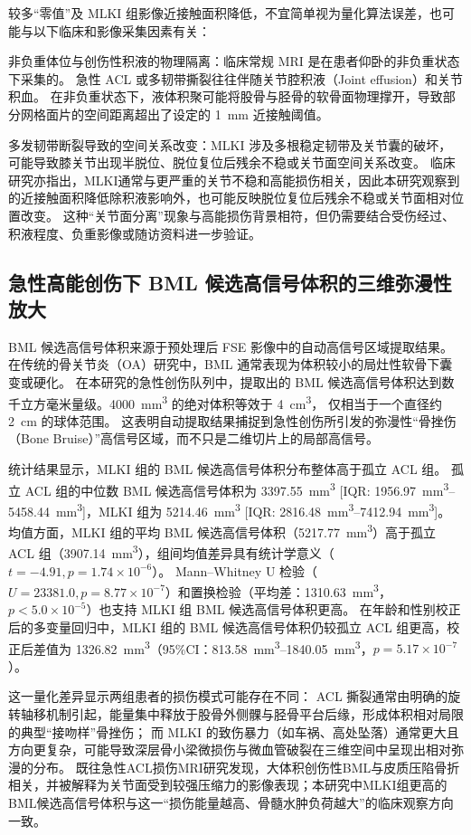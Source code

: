     \par 较多“零值”及 MLKI 组影像近接触面积降低，不宜简单视为量化算法误差，也可能与以下临床和影像采集因素有关：
    \par 非负重体位与创伤性积液的物理隔离：临床常规 MRI 是在患者仰卧的非负重状态下采集的。
    急性 ACL 或多韧带撕裂往往伴随关节腔积液（Joint effusion）和关节积血。
    在非负重状态下，液体积聚可能将股骨与胫骨的软骨面物理撑开，导致部分网格面片的空间距离超出了设定的 \qty{1}{\milli\metre} 近接触阈值。
    \par 多发韧带断裂导致的空间关系改变：MLKI 涉及多根稳定韧带及关节囊的破坏，可能导致膝关节出现半脱位、脱位复位后残余不稳或关节面空间关系改变。
    临床研究亦指出，MLKI通常与更严重的关节不稳和高能损伤相关\cite{moatsheDiagnosisTreatmentMultiligament2017}，因此本研究观察到的近接触面积降低除积液影响外，也可能反映脱位复位后残余不稳或关节面相对位置改变。
    这种“关节面分离”现象与高能损伤背景相符，但仍需要结合受伤经过、积液程度、负重影像或随访资料进一步验证。
  \subsection{急性高能创伤下 BML 候选高信号体积的三维弥漫性放大}
    BML 候选高信号体积来源于预处理后 FSE 影像中的自动高信号区域提取结果。
    在传统的骨关节炎（OA）研究中，BML 通常表现为体积较小的局灶性软骨下囊变或硬化\cite{frobellAcutelyACLInjured2008}。
    在本研究的急性创伤队列中，提取出的 BML 候选高信号体积达到数千立方毫米量级。\qty{4000}{\cubic\milli\metre} 的绝对体积等效于 \qty{4}{\cubic\centi\metre}， 
    仅相当于一个直径约 \qty{2}{\centi\metre} 的球体范围。
    这表明自动提取结果捕捉到急性创伤所引发的弥漫性“骨挫伤（Bone Bruise）”高信号区域，而不只是二维切片上的局部高信号。
    \par 统计结果显示，MLKI 组的 BML 候选高信号体积分布整体高于孤立 ACL 组。
    孤立 ACL 组的中位数 BML 候选高信号体积为 \qty{3397.55}{\cubic\milli\metre} [IQR: \qtyrange{1956.97}{5458.44}{\cubic\milli\metre}]，MLKI 组为 \qty{5214.46}{\cubic\milli\metre} [IQR: \qtyrange{2816.48}{7412.94}{\cubic\milli\metre}]。
    均值方面，MLKI 组的平均 BML 候选高信号体积（\qty{5217.77}{\cubic\milli\metre}）高于孤立 ACL 组（\qty{3907.14}{\cubic\milli\metre}），组间均值差异具有统计学意义（$t=-4.91, p=1.74\times 10^{-6}$）。
    Mann--Whitney U 检验（$U=23381.0, p=8.77\times10^{-7}$）和置换检验（平均差：\qty{1310.63}{\cubic\milli\metre}，$p<5.0\times10^{-5}$）也支持 MLKI 组 BML 候选高信号体积更高。
    在年龄和性别校正后的多变量回归中，MLKI 组的 BML 候选高信号体积仍较孤立 ACL 组更高，校正后差值为 \qty{1326.82}{\cubic\milli\metre}（95\%CI：\qtyrange{813.58}{1840.05}{\cubic\milli\metre}，$p=5.17\times10^{-7}$）。
    \par 这一量化差异显示两组患者的损伤模式可能存在不同：
    ACL 撕裂通常由明确的旋转轴移机制引起，能量集中释放于股骨外侧髁与胫骨平台后缘，形成体积相对局限的典型“接吻样”骨挫伤；
    而 MLKI 的致伤暴力（如车祸、高处坠落）通常更大且方向更复杂，可能导致深层骨小梁微损伤与微血管破裂在三维空间中呈现出相对弥漫的分布。
    既往急性ACL损伤MRI研究发现，大体积创伤性BML与皮质压陷骨折相关，并被解释为关节面受到较强压缩力的影像表现\cite{frobellAcutelyACLInjured2008}；本研究中MLKI组更高的BML候选高信号体积与这一“损伤能量越高、骨髓水肿负荷越大”的临床观察方向一致。
